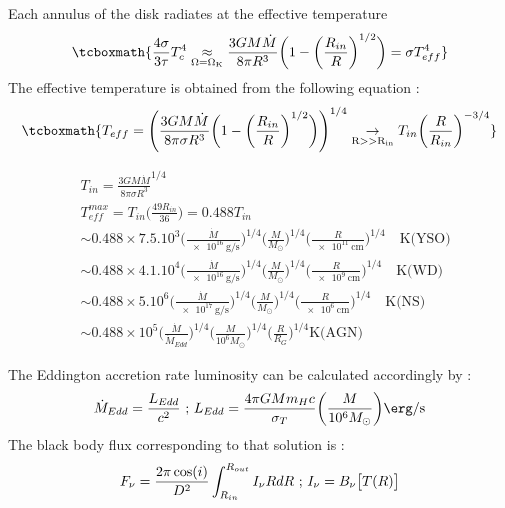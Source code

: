 \documentclass[10pt,a4paper,english,draft]{article}
\begin{document}
Each annulus of the disk radiates at the effective temperature
\begin{equation}
\tcboxmath{
 \frac{4\sigma}{3\tau}T^4_c\underset{\mathrm{\Omega = \Omega_K}}{\approx}
 \frac{3GM\dot{M}}{8\pi R^3}\bigg(  1-\bigg(\frac{R_{in}}{R}\bigg)^{1/2}\bigg) = 
 \sigma T_{eff}^4 
}
\end{equation}
The effective temperature is obtained from the following equation : 
\begin{equation}
\tcboxmath{
T_{eff} = \Bigg( \frac{3GM\dot{M}}{8\pi \sigma R^3}
\bigg(  1-\bigg(\frac{R_{in}}{R}\bigg)^{1/2}\bigg)\Bigg)^{1/4}
\underset{\mathrm{R >>R_{in}}}{\rightarrow} T_{in}\bigg(\frac{R}{R_{in}}\bigg)^{-3/4}
}
\end{equation}

\begin{align}
& T_{in} = \frac{3GM\dot{M}}{8\pi\sigma R^3}^{1/4} \\
& T^{max}_{eff} = T_{in} \bigg(\frac{49 R_{in}}{36}\bigg) = 0.488T_{in} \\ 
& \sim 0.488\times7.5.10^3 \bigg( \frac{\dot{M}}{\SI{e16}{\gram \per \s}}\bigg)^{1/4}
\bigg( \frac{M}{M_{\odot}}\bigg)^{1/4} 
\bigg(  \frac{R}{\SI{e11}{\cm}}\bigg)^{1/4} \quad \text{K(YSO)}     \\
& \sim 0.488\times 4.1.10^4 \bigg( \frac{\dot{M}}{\SI{e16}{\gram \per \s}}\bigg)^{1/4}
\bigg( \frac{M}{M_{\odot}}\bigg)^{1/4} 
\bigg(  \frac{R}{\SI{e9}{\cm}}\bigg)^{1/4} \quad \text{K(WD)}     \\
& \sim 0.488\times 5.10^6  \bigg( \frac{\dot{M}}{\SI{e17}{\gram \per \s}}\bigg)^{1/4}
\bigg( \frac{M}{M_{\odot}}\bigg)^{1/4} 
\bigg(  \frac{R}{\SI{e6}{\cm}}\bigg)^{1/4} \quad \text{K(NS)}     \\
&\sim 0.488 \times 10^5 \bigg(  \frac{\dot{M}}{\dot{M}_{Edd}}\bigg)^{1/4} 
\bigg( \frac{M}{10^6 M_{\odot}}\bigg)^{1/4}
\bigg(  \frac{R}{R_G}\bigg)^{1/4} \text{K(AGN)}
\end{align}

The Eddington accretion rate luminosity can be calculated accordingly by : 
\begin{equation}
\dot{M}_{Edd} = \frac{L_{Edd}}{c^2} \text{ ; } L_{Edd} = \frac{4\pi GMm_Hc}{\sigma_T}
\bigg( \frac{M}{10^6M_{\odot}}\bigg) \si{\erg \per \s}
\end{equation}
The black body flux corresponding to that solution is : 
\begin{equation}	
F_{\nu} = \frac{2\pi \cos (i)}{D^2} \int_{R_{in}}^{R_{out}} I_{\nu}RdR \text{  ;  }
I_{\nu} = B_{\nu}\big[ T(R)\big] \\ 
\end{equation}
\end{document}
